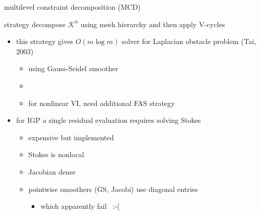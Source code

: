 \documentclass[usepdftitle=false,usenames,dvipsnames]{beamer}
\begin{document}
\begin{frame}{multilevel constraint decomposition (MCD)}

\begin{block}{strategy}
decompose $\mathcal{K}^h$ using mesh hierarchy and then apply V-cycles
\end{block}

\begin{itemize}
\item this strategy gives $O(m\log m)$ solver for Laplacian obstacle problem (Tai, 2003)
    \begin{itemize}
    \item using Gauss-Seidel smoother
    \item {}
    \item for nonlinear VI, need additional FAS strategy {\Large\strut} 
    \end{itemize}
\item for IGP a single residual evaluation requires solving Stokes
    \begin{itemize}
    \item expensive but implemented {\Large\strut} 
    \item Stokes is nonlocal

\smallskip
    \item Jacobian dense

\smallskip
    \item pointwise smoothers (GS, Jacobi) use diagonal entries
        \begin{itemize}
        \item<2>[{\color{black} $\circ$}] \alert{which apparently fail {\Large \, :-(}}
        \end{itemize}
    \end{itemize}
\end{itemize}
\end{frame}
\end{document}
